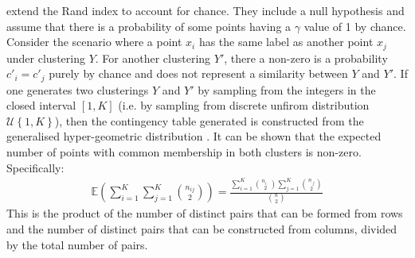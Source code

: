 \documentclass[12pt]{article} %
\begin{document}
\citet{HubertComparingpartitions1985} extend the Rand index to account for chance. They include a null hypothesis and assume that there is a probability of some points having a $\gamma$ value of 1 by chance. Consider the scenario where a point $x_i$ has the same label as another point $x_j$ under clustering $Y$. For another clustering $Y'$, there a non-zero is a probability $c'_i=c'_j$ purely by chance and does not represent a similarity between $Y$ and $Y'$. If one generates two clusterings $Y$ and $Y'$ by sampling from the integers in the closed interval $[1,K]$ (i.e. by sampling from discrete unfirom distribution $\mathcal{U}\left\{1,K\right\}$), then the contingency table generated is constructed from the generalised hyper-geometric distribution \cite{HubertComparingpartitions1985}. It can be shown that the expected number of points with common membership in both clusters is non-zero. Specifically:
\begin{eqnarray}
\mathbb{E}\left(\sum_{i=1}^K \sum_{j=1}^K\binom{n_{ij}}{2}\right) = \frac{\sum_{i=1}^K \binom{n_{i\cdot}}{2} \sum_{j=1}^K \binom{n_{\cdot j}}{2}}{\binom{n}{2}}
\end{eqnarray}
This is the product of the number of distinct pairs that can be formed from rows and the number of distinct pairs that can be constructed from columns, divided by the total number of pairs. 
\end{document}
